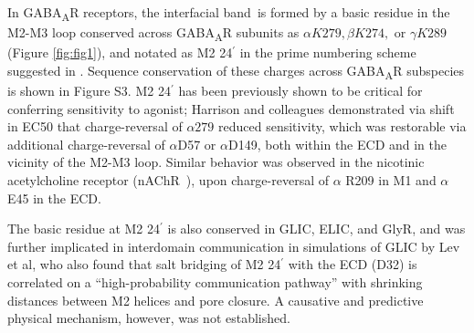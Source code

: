 \documentclass[journal=jacsat,manuscript=article]{achemso}
\newcommand{\sfigAlignment}{S3}
\newcommand{\GABAA}{GABA\textsubscript{A}R\xspace}
\newcommand{\nachr}{nAChR~}
\newcommand{\fivering}{interfacial band~}
\newcommand{\triad}{pore oscillator~}
\begin{document}
In \GABAA receptors, the \fivering is formed by a basic residue in the M2-M3 loop conserved across \GABAA subunits as $\alpha K279, \beta K274,$ or $\gamma K289$ (Figure \ref{fig:fig1}), and notated as M2 24$^{\prime}$ in the prime numbering scheme suggested in \cite{Jaiteh2016}.  Sequence conservation of these charges across \GABAA subspecies is shown in Figure \sfigAlignment. 
M2 24$^{\prime}$ has been previously shown to be critical for conferring sensitivity to agonist; Harrison and colleagues\cite{Kash2003} demonstrated via shift in EC50 that charge-reversal of $\alpha279$ reduced sensitivity, which was restorable via additional charge-reversal of $\alpha$D57 or $\alpha$D149, both within the ECD and in the vicinity of the M2-M3 loop.  Similar behavior was observed in the nicotinic acetylcholine receptor (\nachr), upon charge-reversal of  $\alpha$ R209 in M1 and $\alpha$ E45 in the ECD.\cite{Lee2005}  

The basic residue at M2 24$^{\prime}$ is also conserved in GLIC, ELIC, and GlyR, and was further implicated in interdomain communication in simulations of GLIC by Lev et al\cite{Lev2017}, who also found that salt bridging of M2 24$^{\prime}$ with the ECD (D32) is correlated on a ``high-probability communication pathway'' with shrinking distances between M2 helices and pore closure. %
A causative and predictive physical mechanism, however, was not established. 
\end{document}
